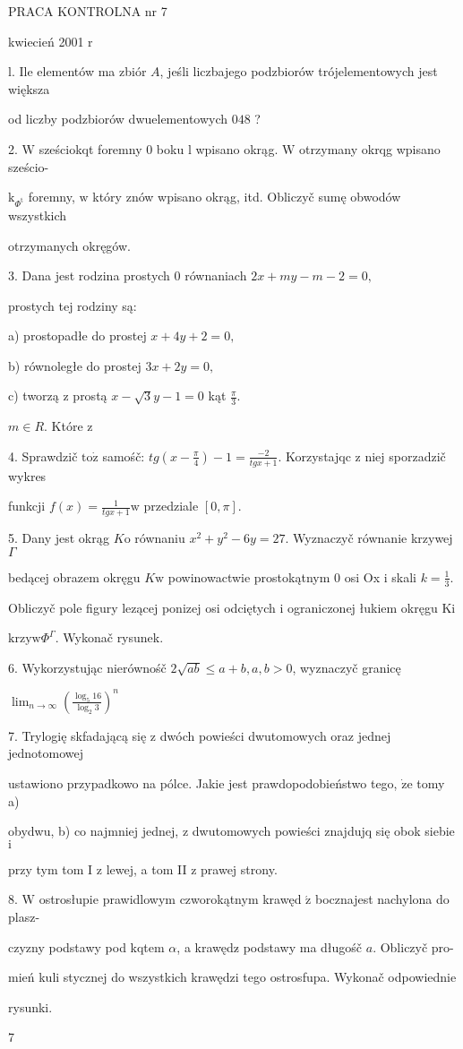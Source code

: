 \documentclass[a4paper,12pt]{article}
\begin{document}
PRACA KONTROLNA nr 7

kwiecień 2001 $\mathrm{r}$

l. Ile elementów ma zbiór $A$, jeśli liczbajego podzbiorów trójelementowych jest większa

od liczby podzbiorów dwuelementowych $048$ ?

2. $\mathrm{W}$ sześciokqt foremny $0$ boku l wpisano okrąg. $\mathrm{W}$ otrzymany okrqg wpisano sześcio-

$\mathrm{k}_{\Phi^{\mathrm{t}}}$ foremny, $\mathrm{w}$ który znów wpisano okrąg, itd. Obliczyč sumę obwodów wszystkich

otrzymanych okręgów.

3. Dana jest rodzina prostych $0$ równaniach $2x+my-m-2=0,$

prostych tej rodziny są:

a) prostopadłe do prostej $x+4y+2=0,$

b) równoległe do prostej $3x+2y=0,$

c) tworzą $\mathrm{z}$ prostą $x-\sqrt{3}y-1=0$ kąt $\displaystyle \frac{\pi}{3}.$

$m\in R$. Które $\mathrm{z}$

4. Sprawdzič $\mathrm{t}\mathrm{o}\dot{\mathrm{z}}$ samośč: $tg(x-\displaystyle \frac{\pi}{4})-1=\frac{-2}{tgx+1}$. Korzystajqc $\mathrm{z}$ niej sporzadzič wykres

funkcji $f(x)=\displaystyle \frac{1}{tgx+1}\mathrm{w}$ przedziale $[0,\pi].$

5. Dany jest okrąg $K\mathrm{o}$ równaniu $x^{2}+y^{2}-6y=27$. Wyznaczyč równanie krzywej $\Gamma$

bedącej obrazem okręgu $K\mathrm{w}$ powinowactwie prostokątnym $0$ osi Ox $\mathrm{i}$ skali $k=\displaystyle \frac{1}{3}.$

Obliczyč pole figury lezącej ponizej osi odciętych $\mathrm{i}$ ograniczonej łukiem okręgu $\mathrm{K}\mathrm{i}$

$\mathrm{k}\mathrm{r}\mathrm{z}\mathrm{y}\mathrm{w}\Phi^{\Gamma}$. Wykonač rysunek.

6. Wykorzystując nierównośč $2\sqrt{ab}\leq a+b, a, b>0$, wyznaczyč granicę

$\displaystyle \lim_{n\rightarrow\infty}(\frac{\log_{5}16}{\log_{2}3})^{n}$

7. Trylogię skfadającą się $\mathrm{z}$ dwóch powieści dwutomowych oraz jednej jednotomowej

ustawiono przypadkowo na pólce. Jakie jest prawdopodobieństwo tego, $\dot{\mathrm{z}}\mathrm{e}$ tomy a)

obydwu, b) co najmniej jednej, $\mathrm{z}$ dwutomowych powieści znajdujq się obok siebie $\mathrm{i}$

przy tym tom I $\mathrm{z}$ lewej, a tom II $\mathrm{z}$ prawej strony.

8. $\mathrm{W}$ ostrosłupie prawidlowym czworokątnym krawęd $\acute{\mathrm{z}}$ bocznajest nachylona do plasz-

czyzny podstawy pod kqtem $\alpha$, a krawędz$\acute{}$ podstawy ma długośč $a$. Obliczyč pro-

mień kuli stycznej do wszystkich krawędzi tego ostrosfupa. Wykonač odpowiednie

rysunki.

7
\end{document}
